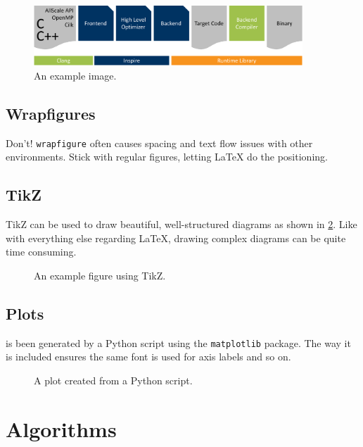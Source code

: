 \begin{figure}
	\centering
	\includegraphics[width=0.9\textwidth]{images/example.pdf}
	\caption{An example image.}
	\label{fig:some_figure}
\end{figure}

\subsection{Wrapfigures}

Don't!
\texttt{wrapfigure} often causes spacing and text flow issues with other environments.
Stick with regular figures, letting \LaTeX{} do the positioning.

\subsection{TikZ}

TikZ can be used to draw beautiful, well-structured diagrams as shown in \cref{fig:tikz_figure}.
Like with everything else regarding \LaTeX, drawing complex diagrams can be quite time consuming.

\begin{figure}
	\centering
	
	\caption{An example figure using TikZ.}
	\label{fig:tikz_figure}
\end{figure}

\subsection{Plots}

 is been generated by a Python script using the \texttt{matplotlib} package.
The way it is included ensures the same font is used for axis labels and so on.

\begin{figure}
	\centering
	
	\caption{A plot created from a Python script.}
	\label{fig:some_plot}
\end{figure}

\section{Algorithms}


